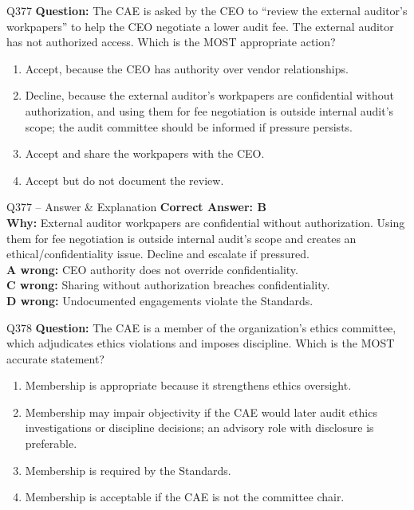 \documentclass[aspectratio=169,10pt]{beamer}
\begin{document}
\begin{frame}[t]{Q377}
	\small
	\textbf{Question:} The CAE is asked by the CEO to ``review the external auditor's workpapers'' to help the CEO negotiate a lower audit fee. The external auditor has not authorized access. Which is the MOST appropriate action?
	\begin{enumerate}[label=\Alph*.,itemsep=1pt,topsep=2pt]
		\item Accept, because the CEO has authority over vendor relationships.
		\item Decline, because the external auditor's workpapers are confidential without authorization, and using them for fee negotiation is outside internal audit's scope; the audit committee should be informed if pressure persists.
		\item Accept and share the workpapers with the CEO.
		\item Accept but do not document the review.
	\end{enumerate}
\end{frame}

\begin{frame}[t]{Q377 -- Answer \& Explanation}
	\small
	\textbf{Correct Answer: B} \\[4pt]
	\textbf{Why:} External auditor workpapers are confidential without authorization. Using them for fee negotiation is outside internal audit's scope and creates an ethical/confidentiality issue. Decline and escalate if pressured. \\[4pt]
	\textbf{A wrong:} CEO authority does not override confidentiality. \\[2pt]
	\textbf{C wrong:} Sharing without authorization breaches confidentiality. \\[2pt]
	\textbf{D wrong:} Undocumented engagements violate the Standards.
\end{frame}
	
	\begin{frame}[t]{Q378}
		\small
		\textbf{Question:} The CAE is a member of the organization's ethics committee, which adjudicates ethics violations and imposes discipline. Which is the MOST accurate statement?
		\begin{enumerate}[label=\Alph*.,itemsep=1pt,topsep=2pt]
			\item Membership is appropriate because it strengthens ethics oversight.
			\item Membership may impair objectivity if the CAE would later audit ethics investigations or discipline decisions; an advisory role with disclosure is preferable.
			\item Membership is required by the Standards.
			\item Membership is acceptable if the CAE is not the committee chair.
		\end{enumerate}
	\end{frame}
	
\end{document}

